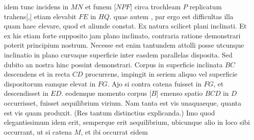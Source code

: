 idem tunc incidens in $\displaystyle MN$ et funem\protect{}
[$\displaystyle NPF$]
circa trochleam\protect{} $\displaystyle P$ replicatum trahens[,]
etiam elevabit $\displaystyle FE$ in $\displaystyle HQ$. quae autem
,
par ergo est difficultas illa quam haec elevare,
quod et aliunde constat. Ex natura scilicet plani inclinati\protect{}.
Et ex his etiam forte supposito jam plano inclinato\protect{},
contraria ratione demonstrari poterit principium nostrum.
Necesse est enim tantundem attolli posse
utcunque inclinatio\protect{} in plano curvaque superficie
inter easdem parallelas disposita.
Sed dubito an nostra hinc possint demonstrari.
\pend
\pstart
Corpus 
in superficie inclinata $\displaystyle BC$
descendens et in recta $\displaystyle CD$ procurrens,
impingit in seriem  aliquo vel superficie dispositorum
eamque elevat in $\displaystyle FG$.
Ajo si contra catena\protect{} fuisset in $\displaystyle FG$,
et descendisset in $\displaystyle ED$.
eodemque momento corpus [$\displaystyle B$]
emenso spatio $\displaystyle BCD$
in $\displaystyle D$ occurrisset,
fuisset aequilibrium virium\protect{}.
Nam tanta est vis unaquaeque, quanta est vis
quam produxit.
(Res tantum distinctius explicanda.)
Imo quod elegantissimum idem erit,
semperque erit aequilibrium\protect{},
ubicunque alio in loco sibi occurrant,
ut si catena\protect{}
$\displaystyle M$, et ibi occurrat eidem
\pend
